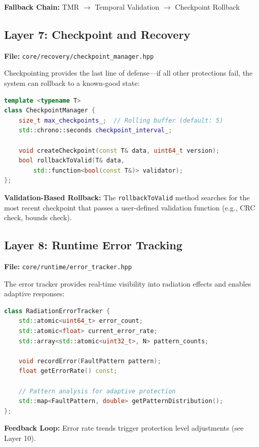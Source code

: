 \documentclass[11pt,a4paper]{article}
\begin{document}
\textbf{Fallback Chain:} TMR $\to$ Temporal Validation $\to$ Checkpoint Rollback

\subsection{Layer 7: Checkpoint and Recovery}

\textbf{File:} \texttt{core/recovery/checkpoint\_manager.hpp}

Checkpointing provides the last line of defense---if all other protections fail, the system can rollback to a known-good state:

\begin{lstlisting}[language=C++, basicstyle=\footnotesize\ttfamily]
template <typename T>
class CheckpointManager {
    size_t max_checkpoints_;  // Rolling buffer (default: 5)
    std::chrono::seconds checkpoint_interval_;

    void createCheckpoint(const T& data, uint64_t version);
    bool rollbackToValid(T& data,
        std::function<bool(const T&)> validator);
};
\end{lstlisting}

\textbf{Validation-Based Rollback:} The \texttt{rollbackToValid} method searches for the most recent checkpoint that passes a user-defined validation function (e.g., CRC check, bounds check).

\subsection{Layer 8: Runtime Error Tracking}

\textbf{File:} \texttt{core/runtime/error\_tracker.hpp}

The error tracker provides real-time visibility into radiation effects and enables adaptive responses:

\begin{lstlisting}[language=C++, basicstyle=\footnotesize\ttfamily]
class RadiationErrorTracker {
    std::atomic<uint64_t> error_count;
    std::atomic<float> current_error_rate;
    std::array<std::atomic<uint32_t>, N> pattern_counts;

    void recordError(FaultPattern pattern);
    float getErrorRate() const;

    // Pattern analysis for adaptive protection
    std::map<FaultPattern, double> getPatternDistribution();
};
\end{lstlisting}

\textbf{Feedback Loop:} Error rate trends trigger protection level adjustments (see Layer 10).
\end{document}
